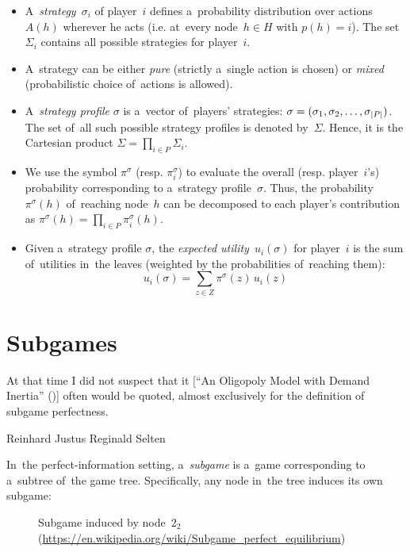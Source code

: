\begin{itemize}
  \item A~\emph{strategy}~$\sigma_i$ of player~$i$ defines a~probability distribution over actions $A(h)$ wherever he acts (i.e. at~every node~$h \in H$ with $p(h) = i$).
    The set~$\Sigma_i$ contains all possible strategies for player~$i$.

  \item A~strategy can be either \emph{pure} (strictly a~single action is chosen) or \emph{mixed} (probabilistic choice of~actions is allowed).

  \item A~\emph{strategy profile} $\sigma$ is a~vector of~players' strategies:
    $\sigma = (\sigma_1, \sigma_2, \ldots, \sigma_ {\left|{P}\right|})$.
    The set of~all such possible strategy profiles is denoted by~$\Sigma$.
    Hence, it is the Cartesian product $\Sigma = \prod_{i \in P} \Sigma_i$.

  \item We use the symbol $\pi^\sigma$ (resp. $\pi_i^\sigma$) to evaluate the overall (resp. player~$i$'s) probability corresponding to a~strategy profile~$\sigma$.
    Thus, the probability $\pi^\sigma(h)$ of~reaching node~$h$ can be decomposed to each player's contribution as $\pi ^\sigma(h) = \prod _{i \in P} \pi _i ^\sigma (h)$.

  \item Given a~strategy profile $\sigma$, the \emph{expected utility}~$u_i (\sigma)$ for player~$i$
    is the sum of~utilities in~the leaves (weighted by the probabilities of~reaching them):
    \[ u_i (\sigma) = \sum _{z \in Z} \pi^\sigma\!(z) \,u_i(z)\]
\end{itemize}

\section{Subgames}
\epigraph{
  At that time I did not suspect that it [``An Oligopoly Model with Demand Inertia'' (\cite{Selten1968oligopoly})] often would be quoted, almost exclusively for the definition of subgame perfectness.
}{Reinhard Justus Reginald Selten}
In~the perfect-information setting, a~\emph{subgame} is a~game corresponding to a~subtree of~the game tree.
Specifically, any node in~the tree induces its own subgame:
\begin{figure}[H]
  \centering
  \scriptsize
  \def\svgwidth{.7\textwidth}
  
  \def\captionTitle{Subgame induced by node~$2_2$}
  \caption[\captionTitle]{\captionTitle{}\\ (\href{https://en.wikipedia.org/wiki/Subgame_perfect_equilibrium}{https://en.wikipedia.org/wiki/Subgame\_perfect\_equilibrium})}
  \label{fig:ext-form-subgame}
\end{figure}

